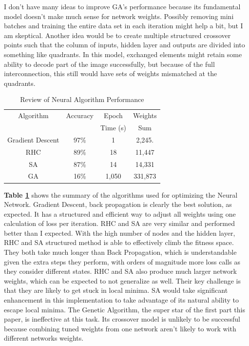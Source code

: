 \documentclass[letterpaper]{article} %
\begin{document}
I don't have many ideas to improve GA's performance because its fundamental model doesn't make much sense for network weights.  Possibly removing mini batches and training the entire data set in each iteration might help a bit, but I am skeptical.  Another idea would be to create multiple structured crossover points such that the column of inputs, hidden layer and outputs are divided into something like quadrants.  In this model, exchanged elements might retain some ability to decode part of the image successfully, but because of the full interconnection, this still would have sets of weights mismatched at the quadrants.

\begin{center}
\begin{table}[!htb]
\begin{tabular}{||c c c c||} 
 \hline
 Algorithm & Accuracy & Epoch   & Weights \\
  		&   		  & Time (s) & Sum \\ [0.5ex] 
 \hline\hline
Gradient Descent & 97\% & 1 & 2,245. \\ 
 \hline
 RHC & 89\% & 18 & 11,447 \\
 \hline
 SA & 87\% & 14 & 14,331 \\
 \hline
 GA & 16\% & 1,050 & 331,873 \\
 \hline
\end{tabular}
\caption{Review of Neural Algorithm Performance}
\label{table:final_neural}
\end{table}
\end{center}

 \textbf{Table \ref{table:final_neural}} shows the summary of the algorithms used for optimizing the Neural Network.  Gradient Descent, back propagation is clearly the best solution, as expected.  It has a structured and efficient way to adjust all weights using one calculation of loss per iteration.  RHC and SA are very similar and performed better than I expected.  With the high number of nodes and the hidden layer, RHC and SA structured method is able to effectively climb the fitness space.  They both take much longer than Back Propagation, which is understandable given the extra steps they perform, with orders of magnitude more loss calls as they consider different states.  RHC and SA also produce much larger network weights, which can be expected to not generalize as well.  Their key challenge is that they are likely to get stuck in local minima.  SA would take significant enhancement in this implementation to take advantage of its natural ability to escape local minima. The Genetic Algorithm, the super star of the first part this paper, is ineffective at this task.  Its crossover model is unlikely to be successful because combining tuned weights from one network aren't likely to work with different networks weights.
 
\end{document}
